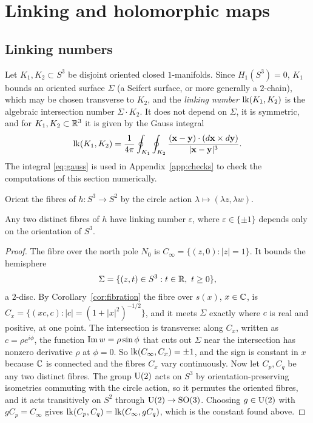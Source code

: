 \section{Linking and holomorphic maps}\label{ch:linking}

\subsection{Linking numbers}\label{sec:lk}

Let $K_1,K_2\subset S^3$ be disjoint oriented closed $1$-manifolds. Since $H_1(S^3)=0$, $K_1$ bounds an oriented surface $\Sigma$ (a Seifert surface, or more generally a $2$-chain), which may be chosen transverse to $K_2$, and the \emph{linking number} $\operatorname{lk}(K_1,K_2)$ is the algebraic intersection number $\Sigma\cdot K_2$. It does not depend on $\Sigma$, it is symmetric, and for $K_1,K_2\subset\mathbb{R}^3$ it is given by the Gauss integral
\begin{equation}\label{eq:gauss}
\operatorname{lk}(K_1,K_2)=\frac1{4\pi}\oint_{K_1}\oint_{K_2}\frac{(\mathbf x-\mathbf y)\cdot(d\mathbf x\times d\mathbf y)}{|\mathbf x-\mathbf y|^3}.
\end{equation}
The integral \eqref{eq:gauss} is used in Appendix~\ref{app:checks} to check the computations of this section numerically.

Orient the fibres of $h\colon S^3\to S^2$ by the circle action $\lambda\mapsto(\lambda z,\lambda w)$.

\begin{proposition}\label{prop:fibrelink}
Any two distinct fibres of $h$ have linking number $\varepsilon$, where $\varepsilon\in\{\pm1\}$ depends only on the orientation of $S^3$.
\end{proposition}

\begin{proof}
The fibre over the north pole $N_0$ is $C_\infty=\{(z,0):|z|=1\}$. It bounds the hemisphere
\[
\Sigma=\{(z,t)\in S^3:t\in\mathbb{R},\ t\ge0\},
\]
a $2$-disc. By Corollary~\ref{cor:fibration} the fibre over $s(x)$, $x\in\mathbb{C}$, is $C_x=\{(xc,c):|c|=(1+|x|^2)^{-1/2}\}$, and it meets $\Sigma$ exactly where $c$ is real and positive, at one point. The intersection is transverse: along $C_x$, written as $c=\rho e^{i\phi}$, the function $\operatorname{Im} w=\rho\sin\phi$ that cuts out $\Sigma$ near the intersection has nonzero derivative $\rho$ at $\phi=0$. So $\operatorname{lk}(C_\infty,C_x)=\pm1$, and the sign is constant in $x$ because $\mathbb{C}$ is connected and the fibres $C_x$ vary continuously. Now let $C_p,C_q$ be any two distinct fibres. The group $\mathrm{U}(2)$ acts on $S^3$ by orientation-preserving isometries commuting with the circle action, so it permutes the oriented fibres, and it acts transitively on $S^2$ through $\mathrm{U}(2)\to\mathrm{SO}(3)$. Choosing $g\in\mathrm{U}(2)$ with $gC_p=C_\infty$ gives $\operatorname{lk}(C_p,C_q)=\operatorname{lk}(C_\infty,gC_q)$, which is the constant found above.
\end{proof}

